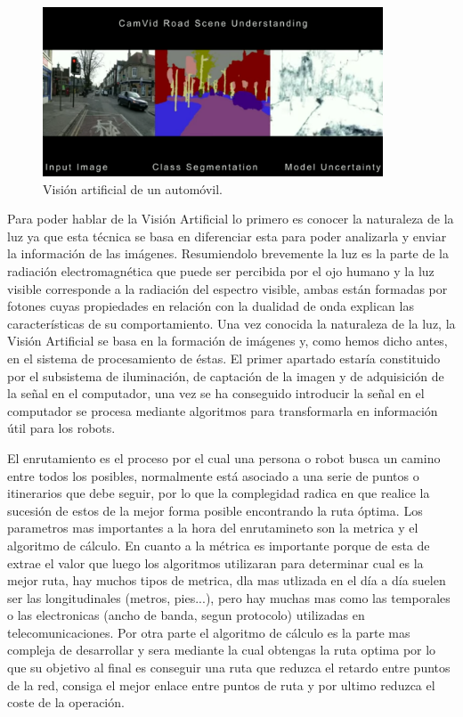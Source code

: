 \begin{figure}[H]
	\begin{center}
		\includegraphics[width=0.9\textwidth]{imag/IMG4.png}
				\caption{Visión artificial de un automóvil.}
	\label{fig:Vista artificial automoviles.}	
	\end{center}
\end{figure}

\hspace{1cm} Para poder hablar de la Visión Artificial lo primero es conocer la naturaleza de la luz ya que esta técnica se basa en diferenciar esta para poder analizarla y enviar la información de las imágenes. Resumiendolo brevemente la luz es la parte de la radiación electromagnética que puede ser percibida por el ojo humano y la luz visible corresponde a la radiación del espectro visible, ambas están formadas por fotones cuyas propiedades en relación con la dualidad de onda explican las características de su comportamiento. Una vez conocida la naturaleza de la luz, la Visión Artificial se basa en la formación de imágenes y, como hemos dicho antes, en el sistema de procesamiento de éstas. El primer apartado estaría constituido  por  el  subsistema  de  iluminación,  de  captación  de  la  imagen  y  de adquisición  de  la  señal  en  el  computador, una vez se ha conseguido introducir la señal en el computador se procesa mediante algoritmos para transformarla en información útil para los robots.
 
\hspace{1cm} El enrutamiento es el proceso por el cual una persona o robot busca un camino entre todos los posibles, normalmente está asociado a una serie de puntos o itinerarios que debe seguir, por lo que la complegidad radica en que realice la sucesión de estos de la mejor forma posible encontrando la ruta óptima. Los parametros mas importantes a la hora del enrutamineto son la metrica y el algoritmo de cálculo.
En cuanto a la métrica es importante porque de esta de extrae el valor que luego los algoritmos utilizaran para determinar cual es la mejor ruta, hay muchos tipos de metrica, dla mas utlizada en el día a día suelen ser las longitudinales (metros, pies...), pero hay muchas mas como las temporales o las electronicas (ancho de banda, segun protocolo) utilizadas en telecomunicaciones. Por otra parte el algoritmo de cálculo es la parte mas compleja de desarrollar y sera mediante la cual obtengas la ruta optima por lo que su objetivo al final es conseguir una ruta que reduzca el retardo entre puntos de la red, consiga el mejor enlace entre puntos de ruta y por ultimo reduzca el coste de la operación.

